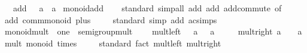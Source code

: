 \begin{isabellebody}
\ \ \ add{\isacharunderscore}{\kern0pt}{}{\isacharcolon}{\kern0pt}\ {\isachardoublequoteopen}{}\ {\isacharplus}{\kern0pt}\ a\ {\isacharequal}{\kern0pt}\ a{\isachardoublequoteclose}\isanewline
{}\isanewline
\isanewline
{}\isamarkupfalse%
\ monoid{\isacharunderscore}{\kern0pt}add\isanewline
%
\isadelimproof
\ \ %
\endisadelimproof
%
\isatagproof
{}\isamarkupfalse%
\ standard\ {\isacharparenleft}{\kern0pt}simp{\isacharunderscore}{\kern0pt}all\ add{\isacharcolon}{\kern0pt}\ add{\isacharunderscore}{\kern0pt}{}\ add{\isachardot}{\kern0pt}commute\ {\isacharbrackleft}{\kern0pt}of\ {\isacharunderscore}{\kern0pt}\ {}{\isacharbrackright}{\kern0pt}{\isacharparenright}{\kern0pt}%
\endisatagproof
{\isafoldproof}%
%
\isadelimproof
\isanewline
%
\endisadelimproof
\isanewline
{}\isamarkupfalse%
\ add{\isacharcolon}{\kern0pt}\ comm{\isacharunderscore}{\kern0pt}monoid\ plus\ {}\isanewline
%
\isadelimproof
\ \ %
\endisadelimproof
%
\isatagproof
{}\isamarkupfalse%
\ standard\ {\isacharparenleft}{\kern0pt}simp\ add{\isacharcolon}{\kern0pt}\ ac{\isacharunderscore}{\kern0pt}simps{\isacharparenright}{\kern0pt}%
\endisatagproof
{\isafoldproof}%
%
\isadelimproof
\isanewline
%
\endisadelimproof
\isanewline
{}\isamarkupfalse%
\isanewline
\isanewline
{}\isamarkupfalse%
\ monoid{\isacharunderscore}{\kern0pt}mult\ {\isacharequal}{\kern0pt}\ one\ {\isacharplus}{\kern0pt}\ semigroup{\isacharunderscore}{\kern0pt}mult\ {\isacharplus}{\kern0pt}\isanewline
\ \ \ mult{\isacharunderscore}{\kern0pt}{}{\isacharunderscore}{\kern0pt}left{\isacharcolon}{\kern0pt}\ {\isachardoublequoteopen}{}\ {\isacharasterisk}{\kern0pt}\ a\ \ {\isacharequal}{\kern0pt}\ a{\isachardoublequoteclose}\isanewline
\ \ \ \ \ mult{\isacharunderscore}{\kern0pt}{}{\isacharunderscore}{\kern0pt}right{\isacharcolon}{\kern0pt}\ {\isachardoublequoteopen}a\ {\isacharasterisk}{\kern0pt}\ {}\ {\isacharequal}{\kern0pt}\ a{\isachardoublequoteclose}\isanewline
{}\isanewline
\isanewline
{}\isamarkupfalse%
\ mult{\isacharcolon}{\kern0pt}\ monoid\ times\ {}\isanewline
%
\isadelimproof
\ \ %
\endisadelimproof
%
\isatagproof
{}\isamarkupfalse%
\ standard\ {\isacharparenleft}{\kern0pt}fact\ mult{\isacharunderscore}{\kern0pt}{}{\isacharunderscore}{\kern0pt}left\ mult{\isacharunderscore}{\kern0pt}{}{\isacharunderscore}{\kern0pt}right{\isacharparenright}{\kern0pt}{\isacharplus}{\kern0pt}%

\end{isabellebody}
